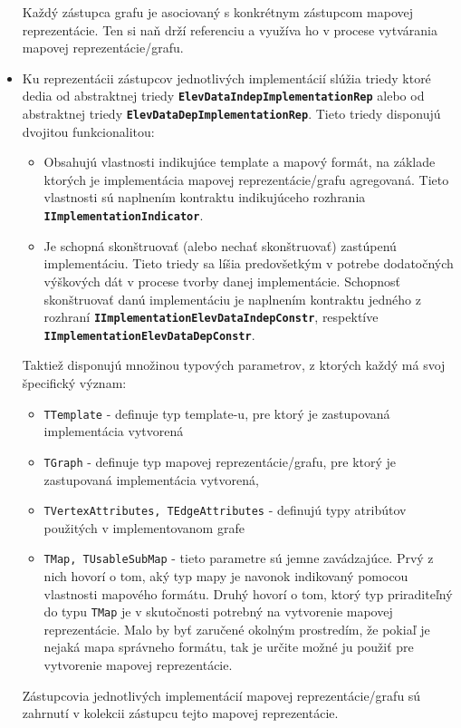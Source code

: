 \begin{itemize}
    Každý zástupca grafu je asociovaný s konkrétnym zástupcom mapovej reprezentácie. Ten si naň drží referenciu a využíva ho v procese vytvárania mapovej reprezentácie/grafu.

    \item Ku reprezentácii zástupcov jednotlivých implementácií slúžia triedy ktoré dedia od abstraktnej triedy \textbf{\texttt{ElevDataIndepImplementationRep}} alebo od abstraktnej triedy \textbf{\texttt{ElevDataDepImplementationRep}}. Tieto triedy disponujú dvojitou funkcionalitou:
    \begin{itemize}
        \item Obsahujú vlastnosti indikujúce template a mapový formát, na základe ktorých je implementácia mapovej reprezentácie/grafu agregovaná. Tieto vlastnosti sú naplnením kontraktu indikujúceho rozhrania \textbf{\texttt{IImplementationIndicator}}.
        \item Je schopná skonštruovať (alebo nechať skonštruovať) zastúpenú implementáciu. Tieto triedy sa líšia predovšetkým v potrebe dodatočných výškových dát v procese tvorby danej implementácie. Schopnosť skonštruovať danú implementáciu je naplnením kontraktu jedného z rozhraní \textbf{\texttt{IImplementationElevDataIndepConstr}}, respektíve \textbf{\texttt{IImplementationElevDataDepConstr}}. 
    \end{itemize}
    Taktiež disponujú množinou typových parametrov, z ktorých každý má svoj špecifický význam:
    \begin{itemize}
        \item \texttt{TTemplate} - definuje typ template-u, pre ktorý je zastupovaná implementácia vytvorená
        \item \texttt{TGraph} - definuje typ mapovej reprezentácie/grafu, pre ktorý je zastupovaná implementácia vytvorená,
        \item \texttt{TVertexAttributes, TEdgeAttributes} - definujú typy atribútov použitých v implementovanom grafe
        \item \texttt{TMap, TUsableSubMap} - tieto parametre sú jemne zavádzajúce. Prvý z nich hovorí o tom, aký typ mapy je navonok indikovaný pomocou vlastnosti mapového formátu. Druhý hovorí o tom, ktorý typ priraditeľný do typu \texttt{TMap} je v skutočnosti potrebný na vytvorenie mapovej reprezentácie. Malo by byť zaručené okolným prostredím, že pokiaľ je nejaká mapa správneho formátu, tak je určite možné ju použiť pre vytvorenie mapovej reprezentácie. 
    \end{itemize}
    
    Zástupcovia jednotlivých implementácií mapovej reprezentácie/grafu sú zahrnutí v kolekcii zástupcu tejto mapovej reprezentácie.

\end{itemize}

